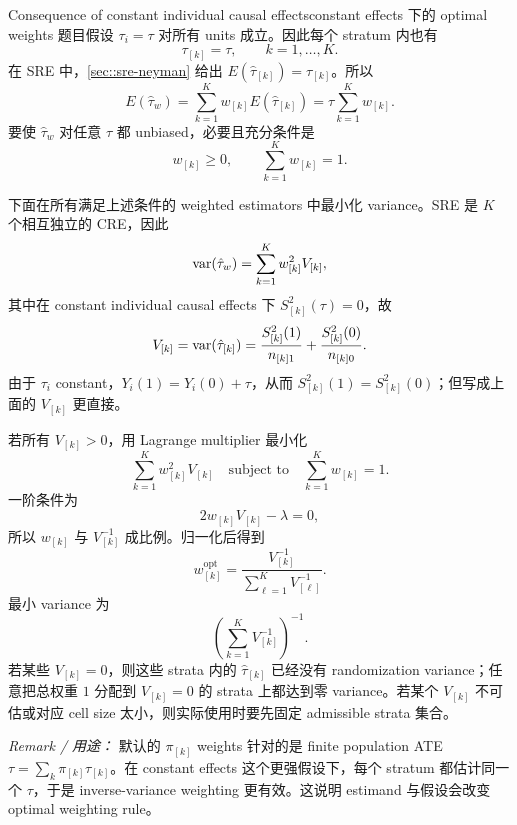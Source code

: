 \begin{exercisesolution}{Consequence of constant individual causal effects}{constant effects 下的 optimal weights}
题目假设 $\tau_i=\tau$ 对所有 units 成立。因此每个 stratum 内也有
\[
\tau_{[k]}=\tau,\qquad k=1,\ldots,K.
\]
在 SRE 中，\cref{sec::sre-neyman} 给出 $E(\hat\tau_{[k]})=\tau_{[k]}$。所以
\[
E(\hat\tau_w)
=\sum_{k=1}^K w_{[k]}E(\hat\tau_{[k]})
=\tau\sum_{k=1}^K w_{[k]}.
\]
要使 $\hat\tau_w$ 对任意 $\tau$ 都 unbiased，必要且充分条件是
\[
w_{[k]}\geq0,\qquad \sum_{k=1}^K w_{[k]}=1.
\]

下面在所有满足上述条件的 weighted estimators 中最小化 variance。SRE 是 $K$ 个相互独立的 CRE，因此
\[
\textup{var}(\hat\tau_w)=\sum_{k=1}^K w_{[k]}^2V_{[k]},
\]
其中在 constant individual causal effects 下 $S_{[k]}^2(\tau)=0$，故
\[
V_{[k]}=\textup{var}(\hat\tau_{[k]})
=\frac{S_{[k]}^2(1)}{n_{[k]1}}
+\frac{S_{[k]}^2(0)}{n_{[k]0}}.
\]
由于 $\tau_i$ constant，$Y_i(1)=Y_i(0)+\tau$，从而 $S_{[k]}^2(1)=S_{[k]}^2(0)$；但写成上面的 $V_{[k]}$ 更直接。

若所有 $V_{[k]}>0$，用 Lagrange multiplier 最小化
\[
\sum_{k=1}^K w_{[k]}^2V_{[k]}
\quad\text{subject to}\quad
\sum_{k=1}^K w_{[k]}=1.
\]
一阶条件为
\[
2w_{[k]}V_{[k]}-\lambda=0,
\]
所以 $w_{[k]}$ 与 $V_{[k]}^{-1}$ 成比例。归一化后得到
\[
w_{[k]}^{\mathrm{opt}}
=
\frac{V_{[k]}^{-1}}{\sum_{\ell=1}^K V_{[\ell]}^{-1}}.
\]
最小 variance 为
\[
\left(\sum_{k=1}^K V_{[k]}^{-1}\right)^{-1}.
\]
若某些 $V_{[k]}=0$，则这些 strata 内的 $\hat\tau_{[k]}$ 已经没有 randomization variance；任意把总权重 $1$ 分配到 $V_{[k]}=0$ 的 strata 上都达到零 variance。若某个 $V_{[k]}$ 不可估或对应 cell size 太小，则实际使用时要先固定 admissible strata 集合。

\emph{Remark / 用途：} 默认的 $\pi_{[k]}$ weights 针对的是 finite population ATE $\tau=\sum_k\pi_{[k]}\tau_{[k]}$。在 constant effects 这个更强假设下，每个 stratum 都估计同一个 $\tau$，于是 inverse-variance weighting 更有效。这说明 estimand 与假设会改变 optimal weighting rule。
\end{exercisesolution}

